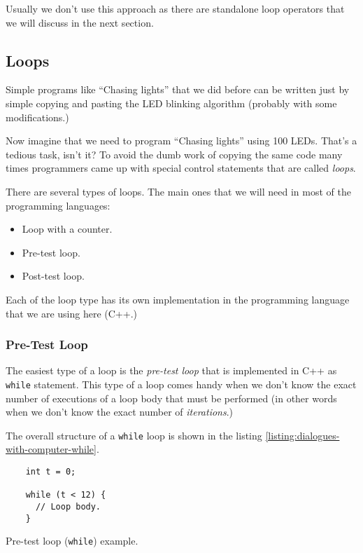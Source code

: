 \documentclass[../sparc.tex]{subfiles}
\begin{document}
Usually we don't use this approach as there are standalone loop operators that
we will discuss in the next section.

\subsection{Loops}

Simple programs like ``Chasing lights'' that we did before can be written just
by simple copying and pasting the LED blinking algorithm (probably with some
modifications.)

Now imagine that we need to program ``Chasing lights'' using 100 LEDs.  That's a
tedious task, isn't it?  To avoid the dumb work of copying the same code many
times programmers came up with special control statements that are called
\emph{loops}.

There are several types of loops.  The main ones that we will need in most of
the programming languages:
\begin{itemize}
\item Loop with a counter.
\item Pre-test loop.
\item Post-test loop.
\end{itemize}

Each of the loop type has its own implementation in the programming language
that we are using here (C++.)

\subsubsection{Pre-Test Loop}

The easiest type of a loop is the \emph{pre-test loop} that is implemented in
C++ as \texttt{while} statement.  This type of a loop comes handy when we don't
know the exact number of executions of a loop body that must be performed (in
other words when we don't know the exact number of \emph{iterations}.)

The overall structure of a \texttt{while} loop is shown in the listing
\ref{listing:dialogues-with-computer-while}.

\begin{listing}[ht]
  \begin{verbatim}
    int t = 0;

    while (t < 12) {
      // Loop body.
    }
  \end{verbatim}
  \label{listing:dialogues-with-computer-while}
  \caption{Pre-test loop (\texttt{while}) example.}
\end{listing}
\end{document}
